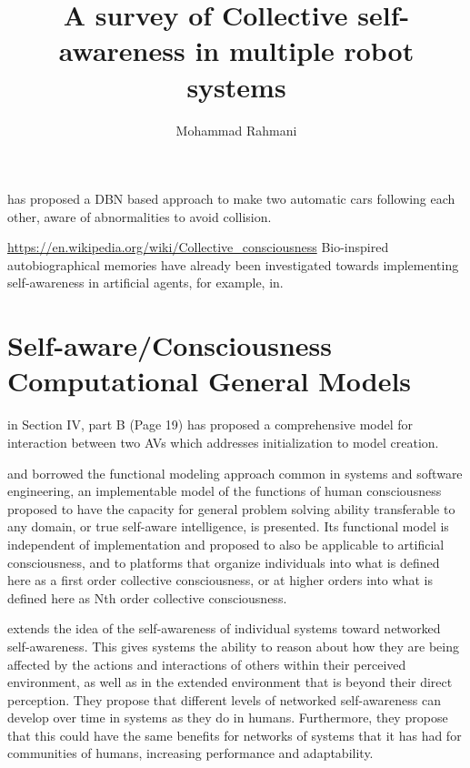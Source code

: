 \documentclass{article}
\begin{document}
	
	\title{A survey of Collective self-awareness in multiple robot systems}
	\author{Mohammad Rahmani}
	\date{}
	\maketitle
	\cite{kanapram-2020-collective-awareness-for-abnormality-detection-in-connected-autonomous-vehicles} has proposed a DBN based approach to make two automatic cars following each other, aware of abnormalities to avoid collision. 
	
	\cite{kephart-2017-self-adaptation-in-collective-self-aware-computing-systems}
	
	\url{https://en.wikipedia.org/wiki/Collective_consciousness} 
	Bio-inspired autobiographical memories have already been investigated towards implementing self-awareness in artificial agents, for example, in\cite{landauer-2015-designing-cooperating-self-improving-systems}.
	
	\section{Self-aware/Consciousness Computational General Models}
	\citet{regazzoni-2020-multi-sensorial-generative-and-descriptive-self-awareness-models-for-autonomous-systems} in Section IV, part B (Page 19) has proposed a comprehensive model for interaction between two AVs which addresses initialization to model creation. 
	
	\citet{williams-2019-a-model-for-human-artificial-collective-consciousness-part-1} and \citet{williams-2019-a-model-for-human-artificial-collective-consciousness-part-2} borrowed the functional modeling approach common in systems and software engineering, an implementable model of the functions of human consciousness proposed to have the capacity for general problem solving ability transferable to any domain, or true self-aware intelligence, is presented. Its functional model is independent of implementation and proposed to also be applicable to artificial consciousness, and to platforms that organize individuals into what is defined here as a first order collective consciousness, or at higher orders into what is defined here as Nth order collective consciousness.
	
	\citet{esterle-2020-i-think-therefore-you-are-models-for-interaction-in-collectives-of-self-aware-cyber-physical-systems} extends the idea of the self-awareness of individual systems toward networked self-awareness. This gives systems the ability to reason about how they are being affected by the actions and interactions of others within their perceived environment, as well as in the extended environment that is beyond their direct perception. They propose that different levels of networked self-awareness can develop over time in systems as they do in humans. Furthermore, they propose that this could have the same benefits for networks of systems that it has had for communities of humans, increasing performance and adaptability.
	
\end{document}
